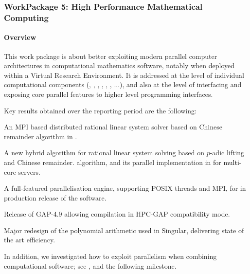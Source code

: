\subsubsection{WorkPackage 5: High Performance Mathematical Computing}
  \label{hpc}


  \paragraph{Overview}

  This work package is about better exploiting modern parallel
  computer architectures in computational mathematics software,
  notably when deployed within a Virtual Research Environment. It is
  addressed at the level of individual computational components
  (\Pari, \GAP, \Linbox, \MPIR, \Sage, \Singular, ...), and also at
  the level of interfacing and exposing core parallel features to
  higher level programming interfaces.

  Key results obtained over the reporting period are the following:
  \begin{compactitem}
  \item An MPI based distributed  rational linear system solver based on Chinese remainder algorithm in \Linbox.
  \item A new hybrid algorithm for rational linear system solving based on $p$-adic lifting and Chinese remainder.
    algorithm, and its parallel implementation in \Linbox for multi-core servers.
  \item A full-featured parallelisation engine, supporting POSIX threads and
    MPI, for \PariGP in production release of the software.
  \item Release of GAP-4.9 allowing compilation  in HPC-GAP compatibility mode.
  \item Major redesign of the polynomial arithmetic used in Singular,
    delivering state of the art efficiency.
  \end{compactitem}
  In addition, we investigated how to exploit parallelism when
  combining computational software; see
  , and
  the following milestone.

